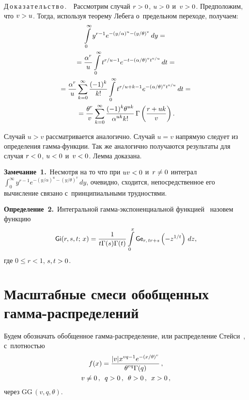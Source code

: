 \begin{multicols}{2}
\noindent
Д\,о\,к\,а\,з\,а\,т\,е\,л\,ь\,с\,т\,в\,о\,.\ \
Рассмотрим случай $r\hm>0$, $u\hm>0$ и~$v\hm>0$. Предположим, 
что $v\hm>u$. Тогда, используя теорему Лебега о~предельном переходе, получаем:
\begin{multline*}
\int\limits_0^{\infty}y^{r-1}e^{-(y/\alpha)^u-(y/\theta)^v} \, dy ={}\\
{}=
\displaystyle\frac{\displaystyle \alpha^{r}\mathstrut}{\displaystyle u\mathstrut}\int\limits_0^{\infty}t^{r/u-1}e^{-t-(\alpha/\theta)^vt^{v/u}} \,  
dt ={}\\
{}=\displaystyle\frac{\displaystyle \alpha^{r}\mathstrut}{\displaystyle u\mathstrut}\sum\limits_{k=0}^\infty\displaystyle\frac{\displaystyle (-1)^k\mathstrut}{\displaystyle k!\mathstrut}
\int\limits_0^{\infty}t^{r/u+k-1}e^{-(\alpha /\theta)^vt^{v/u}} \,  dt 
={}\\
{}=
\displaystyle\frac{\displaystyle \theta^{r}\mathstrut}{\displaystyle v\mathstrut}\sum\limits_{k=0}^\infty\displaystyle\frac{\displaystyle (-1)^k\theta^{uk}\mathstrut}{\displaystyle \alpha^{uk}k!\mathstrut}
\,\Gamma\left(\displaystyle\frac{\displaystyle r+uk\mathstrut}{\displaystyle v\mathstrut}\right).
\end{multline*}

Случай $u>v$ рассматривается аналогично. Случай $u=v$ напрямую следует из 
определения гам\-ма-функ\-ции. Так же аналогично получаются результаты для случая 
$r\hm<0$, $u\hm<0$ и~$v\hm<0$. Лемма доказана.

\smallskip

\noindent
\textbf{Замечание~1.}\
Несмотря на то что при $uv\hm<0$ и~$r\hm\neq0$ интеграл
$\int\nolimits_0^{\infty}y^{r-1}e^{-(y/\alpha)^u-(y/\theta)^v} \, dy$,
очевидно, сходится, непосредственное его вычисление связано с~принципиальными 
трудностями.


\smallskip

\noindent
\textbf{Определение~2.}\
Интегральной гамма-экс\-по\-нен\-ци\-аль\-ной функцией~\cite{KuPaSh2019_2} назовем функцию
$$
{\sf Gi}(r,s,t;\,x)=\displaystyle\frac{\displaystyle 1\mathstrut}{\displaystyle t\Gamma(s)\Gamma(t)\mathstrut}\int\limits_{0}^{x} 
{\sf Ge}_{r,\,tr+s}\left(-z^{1/t}\right) \, dz,
$$
где $0\le r<1$, $s,t\hm>0$.


\section{Масштабные смеси обобщенных гамма-распределений}

Будем обозначать обобщенное гамма-рас\-пре\-де\-ле\-ние, или распределение 
Стейси~\cite{Stacy1962}, с~плот\-ностью
\begin{multline*}
f(x)=\displaystyle\frac{\displaystyle |v| x^{vq -1}e^{-(x/\theta)^v}\mathstrut}{\displaystyle \theta^{vq}\Gamma(q)\mathstrut}\,, \\ v\neq0\,, 
\enskip q>0\,,\enskip 
 \theta >0\,, \enskip x>0\,,
\end{multline*}
через $\mathrm{GG}\,(v,q,\theta)$.


\end{multicols}
